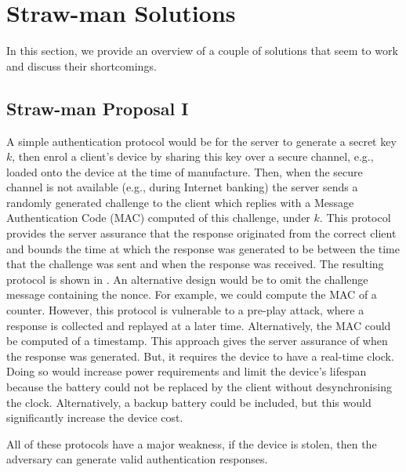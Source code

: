 


\section{{Straw-man Solutions}}
In this section, we provide an overview of a couple of solutions that seem to work and discuss their shortcomings. 

\subsection{Straw-man Proposal I}\label{sec:straw-man-1}

A simple authentication protocol would be for the server to generate a secret key $k$, then enrol a client's device by sharing this key over a secure channel, e.g., loaded onto the device at the time of manufacture.
Then, when the secure channel is not available (e.g., during Internet banking) the server sends a
randomly generated challenge to the client which replies with a Message Authentication Code (MAC)  computed of this challenge, under $k$.
This protocol provides the server assurance
that the response originated from the correct client and
bounds the time at which the response was generated to be between the time that the challenge was sent and when the response was received. 
%
%
The resulting protocol is shown in .  An alternative design would be to omit the challenge message containing
the nonce. For example, we could compute the MAC of a counter. However, this protocol is vulnerable to a pre-play attack, where a
response is collected and replayed at a later time. Alternatively, the
MAC could be computed of a timestamp. This approach
gives the server assurance of when the response was generated.  But, it
requires the device to have a real-time clock. Doing so
would increase power requirements and limit the device's lifespan because
the battery could not be replaced by the client without desynchronising
the clock. Alternatively, a backup battery could be included, but this
would significantly increase the device cost.

All of these protocols have a major weakness, if the device is stolen, then the adversary can generate valid
authentication responses. %






